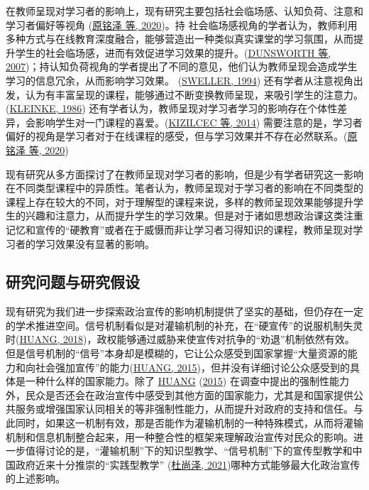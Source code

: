 \documentclass[
  12pt,
]{ctexart}
\begin{document}
在教师呈现对学习者的影响上，现有研究主要包括社会临场感、认知负荷、注意和学习者偏好等视角 (\protect\hyperlink{ref-YuanMingZeEtAl2020a}{原铭泽 等, 2020})。持 社会临场感视角的学者认为，教师利用多种方式与在线教育深度融合，能够营造出一种类似真实课堂的学习氛围，从而提升学生的社会临场感，进而有效促进学习效果的提升。(\protect\hyperlink{ref-DunsworthAtkinson2007}{DUNSWORTH 等, 2007})；持认知负荷视角的学者提出了不同的意见，他们认为教师呈现会造成学生学习的信息冗余，从而影响学习效果。 (\protect\hyperlink{ref-Sweller1994}{SWELLER, 1994}) 还有学者从注意视角出发，认为有丰富呈现的课程，能够通过不断变换教师呈现，来吸引学生的注意力。(\protect\hyperlink{ref-Kleinke1986}{KLEINKE, 1986}) 还有学者认为，教师呈现对学习者学习的影响存在个体性差异，会影响学生对一门课程的喜爱。(\protect\hyperlink{ref-KizilcecEtAl2014}{KIZILCEC 等, 2014}) 需要注意的是，学习者偏好的视角是学习者对于在线课程的感受，但与学习效果并不存在必然联系。(\protect\hyperlink{ref-YuanMingZeEtAl2020a}{原铭泽 等, 2020})

现有研究从多方面探讨了在教师呈现对学习者的影响，但是少有学者研究这一影响在不同类型课程中的异质性。笔者认为，教师呈现对于学习者的影响在不同类型的课程上存在较大的不同，对于理解型的课程来说，多样的教师呈现效果能够提升学生的兴趣和注意力，从而提升学生的学习效果。但是对于诸如思想政治课这类注重记忆和宣传的``硬教育''或者在于威慑而非让学习者习得知识的课程，教师呈现对学习者的学习效果没有显著的影响。

\hypertarget{ux7814ux7a76ux95eeux9898ux4e0eux7814ux7a76ux5047ux8bbe}{%
\subsection{研究问题与研究假设}\label{ux7814ux7a76ux95eeux9898ux4e0eux7814ux7a76ux5047ux8bbe}}

现有研究为我们进一步探索政治宣传的影响机制提供了坚实的基础，但仍存在一定的学术推进空间。信号机制看似是对灌输机制的补充，在``硬宣传''的说服机制失灵时(\protect\hyperlink{ref-Huang2018}{HUANG, 2018})，政权能够通过威胁来使宣传对抗争的``劝退''机制依然有效。但是信号机制的``信号''本身却是模糊的，它让公众感受到国家掌握``大量资源的能力和向社会强加宣传''的能力(\protect\hyperlink{ref-Huang2015a}{HUANG, 2015})，但并没有详细讨论公众感受到的具体是一种什么样的国家能力。除了 \protect\hyperlink{ref-Huang2015a}{HUANG} (\protect\hyperlink{ref-Huang2015a}{2015}) 在调查中提出的强制性能力外，民众是否还会在政治宣传中感受到其他方面的国家能力，尤其是和国家提供公共服务或增强国家认同相关的等非强制性能力，从而提升对政府的支持和信任。与此同时，如果这一机制有效，那是否能作为灌输机制的一种特殊模式，从而将灌输机制和信息机制整合起来，用一种整合性的框架来理解政治宣传对民众的影响。进一步值得讨论的是，``灌输机制''下的知识型教学、``信号机制''下的宣传型教学和中国政府近来十分推崇的``实践型教学'' (\protect\hyperlink{ref-DuShangZe2021}{杜尚泽, 2021})哪种方式能够最大化政治宣传的上述影响。
\end{document}
